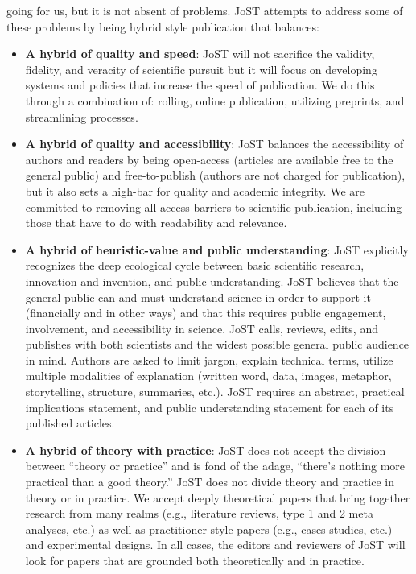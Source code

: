 \documentclass{tufte-handout}
\begin{document}
 going for us, but it is not absent of problems. JoST attempts to address some of these problems by being hybrid style publication that balances: 

\begin{itemize}
    \item \textbf{A hybrid of quality and speed}: JoST will not sacrifice the validity, fidelity, and veracity of scientific pursuit but it will focus on developing systems and policies that increase the speed of publication. We do this through a combination of: rolling, online publication, utilizing preprints, and streamlining processes.

    \item \textbf{A hybrid of quality and accessibility}: JoST balances the accessibility of authors and readers by being open-access (articles are available free to the general public) and free-to-publish (authors are not charged for publication), but it also sets a high-bar for quality and academic integrity. We are committed to removing all access-barriers to scientific publication, including those that have to do with readability and relevance. 

    \item \textbf{A hybrid of heuristic-value and public understanding}: JoST explicitly recognizes the deep ecological cycle between basic scientific research, innovation and invention, and public understanding. JoST believes that the general public can and must understand science in order to support it (financially and in other ways) and that this requires public engagement, involvement, and accessibility in science. JoST calls, reviews, edits, and publishes with both scientists and the widest possible general public audience in mind. Authors are asked to limit jargon, explain technical terms, utilize multiple modalities of explanation (written word, data, images, metaphor, storytelling, structure, summaries, etc.). JoST requires an abstract, practical implications statement, and public understanding statement for each of its published articles. 

    \item \textbf{A hybrid of theory with practice}: JoST does not accept the division between “theory or practice” and is fond of the adage, “there’s nothing more practical than a good theory.” JoST does not divide theory and practice in theory or in practice. We accept deeply theoretical papers that bring together research from many realms (e.g., literature reviews, type 1 and 2 meta analyses, etc.) as well as practitioner-style papers (e.g., cases studies, etc.) and experimental designs.  In all cases, the editors and reviewers of JoST will look for papers that are grounded both theoretically and in practice.


\end{itemize}
\end{document}
